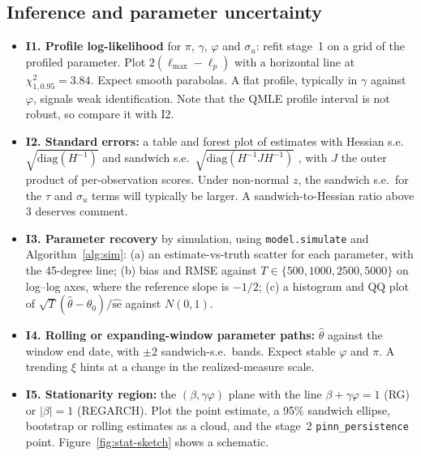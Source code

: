 \documentclass[11pt]{article}
\begin{document}
\subsection{Inference and parameter uncertainty}\label{sec:figs-inf}
\begin{itemize}
\item \textbf{I1. Profile log-likelihood} for $\pi$, $\gamma$, $\varphi$ and $\sigma_u$: refit stage~1
on a grid of the profiled parameter. Plot $2(\ell_{\max}-\ell_p)$ with a horizontal line at
$\chi^2_{1,0.95}=3.84$. Expect smooth parabolas. A flat profile, typically in $\gamma$ against
$\varphi$, signals weak identification. Note that the QMLE profile interval is not robust, so compare it with I2.
\item \textbf{I2. Standard errors:} a table and forest plot of estimates with Hessian s.e.\
$\sqrt{\mathrm{diag}(H^{-1})}$ and sandwich s.e.\ $\sqrt{\mathrm{diag}(H^{-1}JH^{-1})}$
\cite{HHS2012}, with $J$ the outer product of per-observation scores. Under non-normal $z$, the
sandwich s.e.\ for the $\tau$ and $\sigma_u$ terms will typically be larger. A sandwich-to-Hessian
ratio above 3 deserves comment.
\item \textbf{I3. Parameter recovery} by simulation, using \texttt{model.simulate} and
Algorithm~\ref{alg:sim}:
(a) an estimate-vs-truth scatter for each parameter, with the 45-degree line;
(b) bias and RMSE against $T\in\{500,1000,2500,5000\}$ on log--log axes, where the reference slope is $-1/2$;
(c) a histogram and QQ plot of $\sqrt T(\hat\theta-\theta_0)/\widehat{\mathrm{se}}$ against $N(0,1)$.
\item \textbf{I4. Rolling or expanding-window parameter paths:} $\hat\theta$ against the window end date,
with $\pm2$ sandwich-s.e.\ bands. Expect stable $\varphi$ and $\pi$. A trending $\xi$ hints at a change in the
realized-measure scale.
\item \textbf{I5. Stationarity region:} the $(\beta,\gamma\varphi)$ plane with the line
$\beta+\gamma\varphi=1$ (RG) or $|\beta|=1$ (REGARCH). Plot the point estimate, a 95\% sandwich ellipse,
bootstrap or rolling estimates as a cloud, and the stage~2 \texttt{pinn\_persistence} point.
Figure~\ref{fig:stat-sketch} shows a schematic.
\end{itemize}
\end{document}
